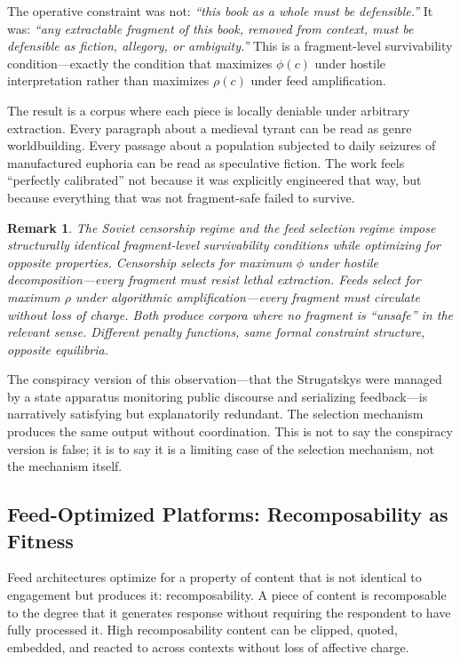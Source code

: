 \documentclass[12pt]{article}
\newtheorem{remark}{Remark}[section]
\newcommand{\bind}{\phi}
\newcommand{\recomp}{\rho}
\begin{document}
The operative constraint was not: \emph{``this book as a whole must be
defensible.''} It was: \emph{``any extractable fragment of this book,
removed from context, must be defensible as fiction, allegory, or
ambiguity.''} This is a fragment-level survivability condition—exactly the
condition that maximizes $\bind(c)$ under hostile interpretation rather than
maximizes $\recomp(c)$ under feed amplification.

The result is a corpus where each piece is locally deniable under arbitrary
extraction. Every paragraph about a medieval tyrant can be read as genre
worldbuilding. Every passage about a population subjected to daily seizures
of manufactured euphoria can be read as speculative fiction. The work feels
``perfectly calibrated'' not because it was explicitly engineered that way,
but because everything that was not fragment-safe failed to survive.

\begin{remark}
The Soviet censorship regime and the feed selection regime impose
structurally identical fragment-level survivability conditions while
optimizing for opposite properties. Censorship selects for maximum
$\bind$ under hostile decomposition—every fragment must resist lethal
extraction. Feeds select for maximum $\recomp$ under algorithmic
amplification—every fragment must circulate without loss of charge.
Both produce corpora where no fragment is ``unsafe'' in the relevant
sense. Different penalty functions, same formal constraint structure,
opposite equilibria.
\end{remark}

The conspiracy version of this observation—that the Strugatskys were
managed by a state apparatus monitoring public discourse and serializing
feedback—is narratively satisfying but explanatorily redundant. The
selection mechanism produces the same output without coordination. This
is not to say the conspiracy version is false; it is to say it is a
limiting case of the selection mechanism, not the mechanism itself.

\subsection{Feed-Optimized Platforms: Recomposability as Fitness}
\label{ssec:feed}

Feed architectures optimize for a property of content that is not identical to
engagement but produces it: recomposability. A piece of content is
recomposable to the degree that it generates response without requiring the
respondent to have fully processed it. High recomposability content can be
clipped, quoted, embedded, and reacted to across contexts without loss of
affective charge.
\end{document}

